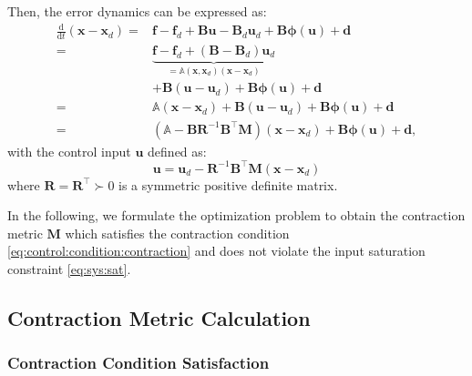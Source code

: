 \documentclass{ifacconf}
\newcommand*{\mv}[1]{\boldsymbol{#1}} %
\newcommand*{\mm}[1]{\boldsymbol{#1}} %
\newcommand\der{\mathrm d}
\newcommand*{\ddtt}{
   \tfrac{\der}{\der t}
}
\begin{document}
Then, the error dynamics can be expressed as:
\begin{equation} \label{eq:error:dyn}
   \begin{aligned}
      \ddtt
      (
         \mv{x} - \mv{x}_d
      )
      =&
      \mv{f}-\mv{f}_d
      + \mm{B} \mv{u}
      - \mm{B}_d \mv{u}_d
      + \mm{B} \mv{\phi}(\mv{u}) + \mv{d}
      \\
      =&
      \underbrace
      {
         \mv{f}-\mv{f}_d
         +
         (
            \mm{B} 
            - \mm{B}_d 
         ) \mv{u}_d
      }_{= \mathbb{A}(\mv{x},\mv{x}_d) (\mv{x} - \mv{x}_d)}
      \\
      &
      + \mm{B} 
      (
         \mv{u} - \mv{u}_d
      )
      + \mm{B} \mv{\phi}(\mv{u}) + \mv{d}
      \\
      =&
      \mathbb{A} (\mv{x} - \mv{x}_d)
      + \mm{B} 
      (\mv{u} - \mv{u}_d)
      + \mm{B} \mv{\phi}(\mv{u}) + \mv{d}
      \\
      =&
      \left(
         \mathbb{A} - \mm{B} \mm{R}^{-1} \mm{B} ^\top \mm{M}
      \right)
      (\mv{x} - \mv{x}_d)
      + \mm{B} \mv{\phi}(\mv{u}) + \mv{d}
      ,
   \end{aligned}
\end{equation}
with the control input $\mv{u}$ defined as:
\begin{equation} \label{eq:control:input}
   \mv{u}
   =
   \mv{u}_d
   -
   \mm{R}^{-1} \mm{B}^\top \mm{M} (\mv{x} - \mv{x}_d)
\end{equation}
where $\mm{R}=\mm{R}^\top \succ 0$ is a symmetric positive definite matrix.

In the following, we formulate the optimization problem to obtain the contraction metric $\mm{M}$ which satisfies the contraction condition \eqref{eq:control:condition:contraction} and does not violate the input saturation constraint \eqref{eq:sys:sat}.


\subsection{Contraction Metric Calculation}

\subsubsection{Contraction Condition Satisfaction}
\end{document}
